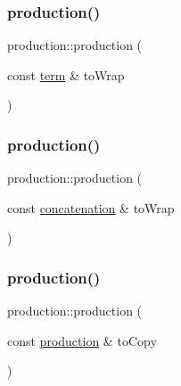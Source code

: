 \mbox{\label{classproduction_a033cf041abac0ff5a2584d715f95cf30}} 
\subsubsection{\texorpdfstring{production()}{production()}\hspace{0.1cm}{\footnotesize\ttfamily [4/6]}}
{\footnotesize\ttfamily production\+::production (\begin{DoxyParamCaption}\item[{const \mbox{\hyperlink{classterm}{term}} \&}]{to\+Wrap }\end{DoxyParamCaption})\hspace{0.3cm}{\ttfamily [inline]}}

\mbox{\label{classproduction_a4ca0398b3f433d983dc9fcb753a39d95}} 
\subsubsection{\texorpdfstring{production()}{production()}\hspace{0.1cm}{\footnotesize\ttfamily [5/6]}}
{\footnotesize\ttfamily production\+::production (\begin{DoxyParamCaption}\item[{const \mbox{\hyperlink{classconcatenation}{concatenation}} \&}]{to\+Wrap }\end{DoxyParamCaption})}

\mbox{\label{classproduction_a4aec3b88e42628160b8cd104b73f33a7}} 
\subsubsection{\texorpdfstring{production()}{production()}\hspace{0.1cm}{\footnotesize\ttfamily [6/6]}}
{\footnotesize\ttfamily production\+::production (\begin{DoxyParamCaption}\item[{const \mbox{\hyperlink{classproduction}{production}} \&}]{to\+Copy }\end{DoxyParamCaption})\hspace{0.3cm}{\ttfamily [inline]}}



